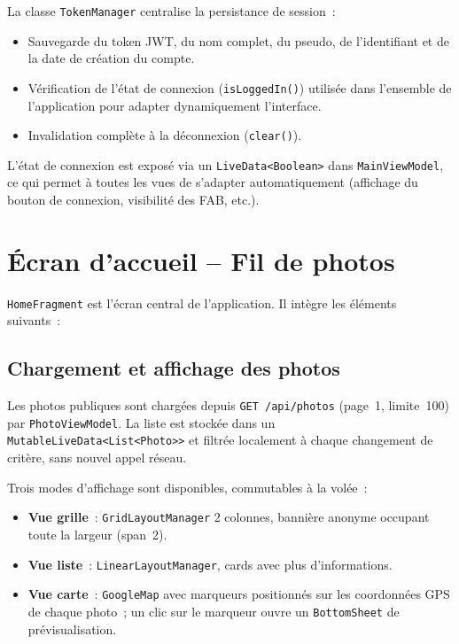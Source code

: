 \documentclass[12pt, a4paper]{report}
\begin{document}
La classe \texttt{TokenManager} centralise la persistance de session~:
\begin{itemize}
  \item Sauvegarde du token JWT, du nom complet, du pseudo, de l'identifiant et de la date
        de création du compte.
  \item Vérification de l'état de connexion (\texttt{isLoggedIn()}) utilisée dans
        l'ensemble de l'application pour adapter dynamiquement l'interface.
  \item Invalidation complète à la déconnexion (\texttt{clear()}).
\end{itemize}

L'état de connexion est exposé via un \texttt{LiveData<Boolean>} dans \texttt{MainViewModel},
ce qui permet à toutes les vues de s'adapter automatiquement (affichage du bouton de
connexion, visibilité des FAB, etc.).

\section{Écran d'accueil -- Fil de photos}

\texttt{HomeFragment} est l'écran central de l'application. Il intègre les éléments suivants~:

\subsection{Chargement et affichage des photos}

Les photos publiques sont chargées depuis \texttt{GET /api/photos} (page~1, limite~100) par
\texttt{PhotoViewModel}. La liste est stockée dans un \texttt{MutableLiveData<List<Photo>>}
et filtrée localement à chaque changement de critère, sans nouvel appel réseau.

Trois modes d'affichage sont disponibles, commutables à la volée~:

\begin{itemize}
  \item \textbf{Vue grille}~: \texttt{GridLayoutManager} 2 colonnes, bannière anonyme
        occupant toute la largeur (span~2).
  \item \textbf{Vue liste}~: \texttt{LinearLayoutManager}, cards avec plus d'informations.
  \item \textbf{Vue carte}~: \texttt{GoogleMap} avec marqueurs positionnés sur les
        coordonnées GPS de chaque photo~; un clic sur le marqueur ouvre un
        \texttt{BottomSheet} de prévisualisation.
\end{itemize}
\end{document}

